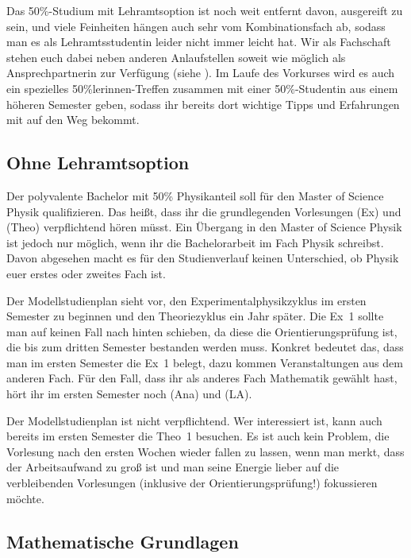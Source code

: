 Das 50\%-Studium mit Lehramtsoption ist noch weit entfernt davon, ausgereift zu sein, und viele Feinheiten hängen auch sehr vom Kombinationsfach ab, sodass man es als Lehramtsstudentin leider nicht immer leicht hat. Wir als Fachschaft stehen euch dabei neben anderen Anlaufstellen soweit wie möglich als Ansprechpartnerin zur Verfügung (siehe ). Im Laufe des Vorkurses wird es auch ein spezielles 50\%lerinnen-Treffen zusammen mit einer 50\%-Studentin aus einem höheren Semester geben, sodass ihr bereits dort wichtige Tipps und Erfahrungen mit auf den Weg bekommt.

\subsection{Ohne Lehramtsoption}

Der polyvalente Bachelor mit 50\% Physikanteil soll für den Master of Science Physik qualifizieren. Das heißt, dass ihr die grundlegenden Vorlesungen  (\gls{Ex}) und  (\gls{Theo}) verpflichtend hören müsst. Ein Übergang in den Master of Science Physik ist jedoch nur möglich, wenn ihr die Bachelorarbeit im Fach Physik schreibst. Davon abgesehen macht es für den Studienverlauf keinen Unterschied, ob Physik euer erstes oder zweites Fach ist.

Der Modellstudienplan sieht vor, den Experimentalphysikzyklus im ersten Semester zu beginnen und den Theoriezyklus ein Jahr später. Die \gls{Ex}~1 sollte man auf keinen Fall nach hinten schieben, da diese die Orientierungsprüfung ist, die bis zum dritten Semester bestanden werden muss.
Konkret bedeutet das, dass man im ersten Semester die \gls{Ex}~1 belegt, dazu kommen Veranstaltungen aus dem anderen Fach.
Für den Fall, dass ihr als anderes Fach Mathematik gewählt hast, hört ihr im ersten Semester noch  (\gls{Ana}) und  (\gls{LA}).

Der Modellstudienplan ist nicht verpflichtend. Wer interessiert ist, kann auch bereits im ersten Semester die \gls{Theo}~1 besuchen. Es ist auch kein Problem, die Vorlesung nach den ersten Wochen wieder fallen zu lassen, wenn man merkt, dass der Arbeitsaufwand zu groß ist und man seine Energie lieber auf die verbleibenden Vorlesungen (inklusive der Orientierungsprüfung!) fokussieren möchte.

\subsection{Mathematische Grundlagen}
\label{mathegrundlagen}

